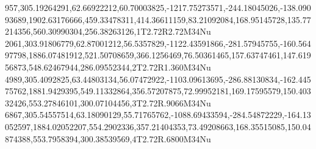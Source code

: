957,305.19264291,62.66922212,60.70003825,-1217.75273571,-244.18045026,-138.09093689,1902.63176666,459.33478311,414.36611159,83.21092084,168.95145728,135.77214356,560.30990304,256.38263126,1T2.72R2.72M34Nu
2061,303.91806779,62.87001212,56.5357829,-1122.43591866,-281.57945755,-160.56497798,1886.07481912,521.50708659,366.1256469,76.50361465,157.63747461,147.61956873,548.62467944,286.09552344,2T2.72R1.360M34Nu
4989,305.4092825,63.44803134,56.07472922,-1103.09613695,-286.88130834,-162.44575762,1881.9429395,549.11332864,356.57207875,72.99952181,169.17595579,150.40332426,553.27846101,300.07104456,3T2.72R.9066M34Nu
6867,305.54557514,63.18090129,55.71765762,-1088.69433594,-284.54872229,-164.13052597,1884.02052207,554.2902336,357.21404353,73.49208663,168.35515085,150.04874388,553.7958394,300.38539569,4T2.72R.6800M34Nu
